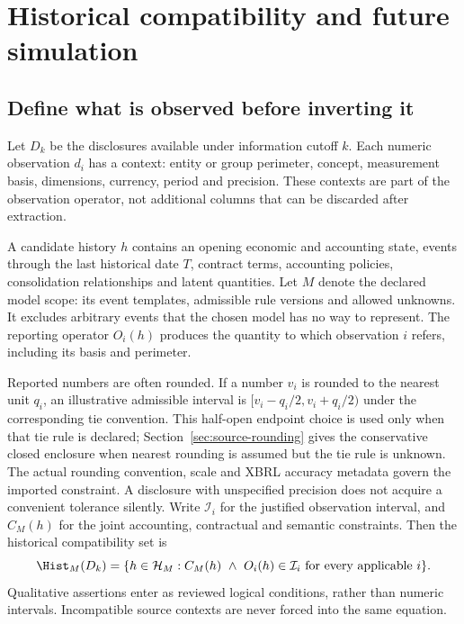 \chapter{Historical compatibility and future simulation}
\label{ch:math}

\section{Define what is observed before inverting it}

Let $D_k$ be the disclosures available under information cutoff $k$. Each
numeric observation $d_i$ has a context: entity or group perimeter, concept,
measurement basis, dimensions, currency, period and precision. These contexts
are part of the observation operator, not additional columns that can be
discarded after extraction.

A candidate history $h$ contains an opening economic and accounting state,
events through the last historical date $T$, contract terms, accounting
policies, consolidation relationships and latent quantities. Let $M$ denote
the declared model scope: its event templates, admissible rule versions and
allowed unknowns. It excludes arbitrary events that the chosen model has no
way to represent. The reporting operator $O_i(h)$ produces the quantity to
which observation $i$ refers, including its basis and perimeter.

Reported numbers are often rounded. If a number $v_i$ is rounded to the nearest
unit $q_i$, an illustrative admissible interval is
$[v_i-q_i/2,v_i+q_i/2)$ under the corresponding tie convention. This
half-open endpoint choice is used only when that tie rule is declared;
Section~\ref{sec:source-rounding} gives the conservative closed enclosure when
nearest rounding is assumed but the tie rule is unknown. The actual
rounding convention, scale and XBRL accuracy metadata govern the imported
constraint. A disclosure with unspecified precision does not acquire a
convenient tolerance silently. Write $\mathcal{I}_i$ for the justified
observation interval, and $C_M(h)$ for the joint accounting, contractual and
semantic constraints. Then the historical compatibility set is
\begin{equation}\label{eq:histset}
 \Hist_M(D_k)=\{h\in\mathcal{H}_M:
 C_M(h)\ \land\ O_i(h)\in\mathcal{I}_i\text{ for every applicable }i\}.
\end{equation}
Qualitative assertions enter as reviewed logical conditions, rather than
numeric intervals. Incompatible source contexts are never forced into the
same equation.

